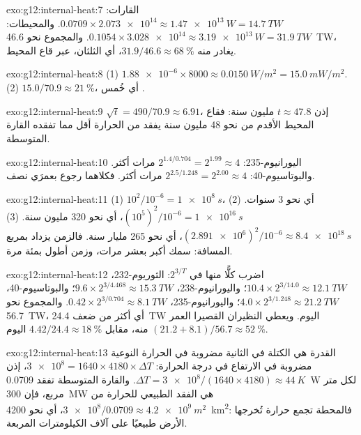 \begin{solution}{exo:g12:internal-heat:7}
القارات: $0.0709 \times \num{2.073e14} \approx \qty{1.47e13}{W} =
\qty{14.7}{TW}$. والمحيطات: $0.1054 \times \num{3.028e14} \approx
\qty{3.19e13}{W} = \qty{31.9}{TW}$. والمجموع نحو \qty{46.6}{TW}، يغادر منه
$31.9/46.6 \approx \qty{68}{\percent}$، أي الثلثان، عبر قاع
المحيط.
\end{solution}

\begin{solution}{exo:g12:internal-heat:8}
(1) $\num{1.88e-6} \times 8000 \approx \qty{0.0150}{W/m^2} = \qty{15.0}{mW/m^2}$.
(2) $15.0/70.9 \approx \qty{21}{\percent}$، أي خُمس .
\end{solution}

\begin{solution}{exo:g12:internal-heat:9}
$\sqrt{t} = 490/70.9 \approx 6.91$، إذن $t \approx 47.8$ مليون سنة: فقاع
المحيط الأقدم من نحو 48 مليون سنة يفقد من الحرارة أقل مما تفقده القارة
المتوسطة.
\end{solution}

\begin{solution}{exo:g12:internal-heat:10}
اليورانيوم-235: $2^{1.4/0.704} = 2^{1.99} \approx 4$ مرات أكثر. والبوتاسيوم-40:
$2^{2.5/1.248} = 2^{2.00} \approx 4$ مرات أكثر. فكلاهما رجوع بعمرَي نصف.
\end{solution}

\begin{solution}{exo:g12:internal-heat:11}
(1) $10^2/10^{-6} = \qty{1e8}{s}$، أي نحو 3 سنوات. (2) $(10^5)^2/10^{-6} =
\qty{1e16}{s}$، أي نحو 320 مليون سنة. (3) $(\num{2.891e6})^2/10^{-6}
\approx \qty{8.4e18}{s}$، أي نحو 265 مليار سنة. فالزمن يزداد بمربع
المسافة: سمك أكبر بعشر مرات، وزمن أطول بمئة مرة.
\end{solution}

\begin{solution}{exo:g12:internal-heat:12}
اضرب كلًّا منها في $2^{3/T}$: الثوريوم-232، $10.4 \times 2^{3/14.0} \approx
\qty{12.1}{TW}$؛ واليورانيوم-238، $9.6 \times 2^{3/4.468} \approx \qty{15.3}{TW}$؛
والبوتاسيوم-40، $4.0 \times 2^{3/1.248} \approx \qty{21.2}{TW}$؛ واليورانيوم-235،
$0.42 \times 2^{3/0.704} \approx \qty{8.1}{TW}$. والمجموع نحو \qty{56.7}{TW}،
أي أكثر من ضعف \qty{24.4}{TW} اليوم. ويعطي النظيران القصيرا العمر
$(21.2 + 8.1)/56.7 \approx \qty{52}{\percent}$ منه، مقابل
$4.42/24.4 \approx \qty{18}{\percent}$ اليوم.
\end{solution}

\begin{solution}{exo:g12:internal-heat:13}
القدرة هي الكتلة في الثانية مضروبة في الحرارة النوعية مضروبة في
الارتفاع في درجة الحرارة: $\num{3e8} = 1640 \times 4180 \times \Delta T$، إذن $\Delta T =
\num{3e8}/(1640 \times 4180) \approx \qty{44}{K}$. والقارة المتوسطة تفقد
\qty{0.0709}{W} لكل متر مربع، فإن \qty{300}{MW} هي الفقد الطبيعي للحرارة
من $\num{3e8}/0.0709 \approx \qty{4.2e9}{m^2}$، أي نحو \qty{4200}{km^2}:
فالمحطة تجمع حرارة تُخرجها الأرض طبيعيًا على آلاف
الكيلومترات المربعة.
\end{solution}

